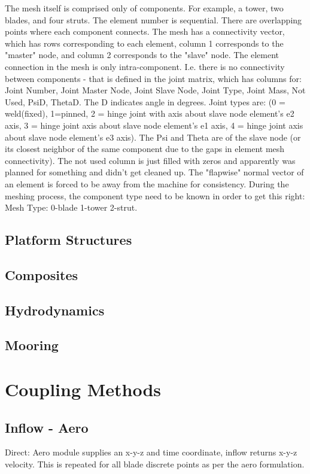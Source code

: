 \documentclass[11pt]{article}
\begin{document}
The mesh itself is comprised only of components.  For example, a tower, two blades, and four struts.  The element number is sequential. There are overlapping points where each component connects.  The mesh has a connectivity vector, which has rows corresponding to each element, column 1 corresponds to the "master" node, and column 2 corresponds to the "slave" node.  The element connection in the mesh is only intra-component.  I.e. there is no connectivity between components - that is defined in the joint matrix, which has columns for: Joint Number,   Joint Master Node, Joint Slave Node, Joint Type, Joint Mass, Not Used, PsiD, ThetaD.  The D indicates angle in degrees.  Joint types are: (0 = weld(fixed), 1=pinned, 2 = hinge joint with axis about slave node element’s e2 axis, 3 = hinge joint axis about slave node element’s e1 axis, 4 = hinge joint axis about slave node element’s e3 axis).  The Psi and Theta are of the slave node (or its closest neighbor of the same component due to the gaps in element mesh connectivity). The not used column is just filled with zeros and apparently was planned for something and didn't get cleaned up.  The "flapwise" normal vector of an element is forced to be away from the machine for consistency.  During the meshing process, the component type need to be known in order to get this right: Mesh Type: 0-blade 1-tower 2-strut.

\subsection{Platform Structures}
\subsection{Composites}
\subsection{Hydrodynamics}
\subsection{Mooring}

\section{Coupling Methods}

\subsection{Inflow - Aero}
Direct: Aero module supplies an x-y-z and time coordinate, inflow returns x-y-z velocity.  This is repeated for all blade discrete points as per the aero formulation.
\end{document}
